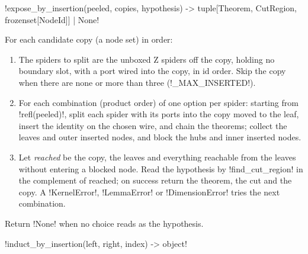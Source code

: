 \begin{signature}
\py!expose_by_insertion(peeled, copies, hypothesis) -> tuple[Theorem, CutRegion, frozenset[NodeId]] | None!
\end{signature}

\begin{algorithm}\label{alg:proofs-insertion}
For each candidate copy (a node set) in order:
\begin{enumerate}
\item The spiders to split are the unboxed Z spiders off the copy, holding no boundary slot, with a port wired into the copy, in id order. Skip the copy when there are none or more than three (\py!_MAX_INSERTED!).
\item For each combination (product order) of one option per spider: starting from \py!refl(peeled)!, split each spider with its ports into the copy moved to the leaf, insert the identity on the chosen wire, and chain the theorems; collect the leaves and outer inserted nodes, and block the hubs and inner inserted nodes.
\item Let \emph{reached} be the copy, the leaves and everything reachable from the leaves without entering a blocked node. Read the hypothesis by \py!find_cut_region! in the complement of reached; on success return the theorem, the cut and the copy. A \py!KernelError!, \py!LemmaError! or \py!DimensionError! tries the next combination.
\end{enumerate}
Return \py!None! when no choice reads as the hypothesis.
\end{algorithm}

\begin{signature}
\py!induct_by_insertion(left, right, index) -> object!
\end{signature}

